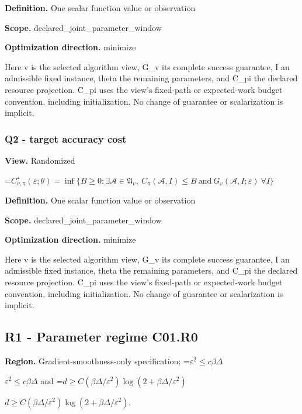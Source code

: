 \documentclass[10pt,a4paper]{article}
\newcommand{\AtlasMath}[1]{\par\begingroup\centering\setbox0=\hbox{$\displaystyle #1$}\ifdim\wd0>1.4\linewidth\typeout{ATLAS WIDE FORMULA: \the\wd0}\fi\ifdim\wd0>\linewidth\resizebox{\linewidth}{!}{\box0}\else\box0\fi\par\endgroup}
\newcommand{\AtlasInlineMath}[1]{\begingroup\setbox0=\hbox{$#1$}\ifdim\wd0>.4\linewidth\endgroup\AtlasMath{#1}\else\endgroup$#1$\fi}
\begin{document}
\textbf{Definition.} One scalar function value or observation



\textbf{Scope.} declared\_joint\_parameter\_window



\textbf{Optimization direction.} minimize



Here v is the selected algorithm view, G\_v its complete success guarantee, I an admissible fixed instance, theta the remaining parameters, and C\_pi the declared resource projection. C\_pi uses the view's fixed-path or expected-work budget convention, including initialization. No change of guarantee or scalarization is implicit.



\subsubsection{Q2 - target accuracy cost}


\textbf{View.} Randomized



\AtlasMath{C^\star_{v,\pi}(\varepsilon;\theta)=\inf\{B\ge0:\exists\mathcal A\in\mathfrak A_v,\ C_\pi(\mathcal A,I)\le B\ \text{and}\ G_v(\mathcal A,I;\varepsilon)\ \forall I\}}


\textbf{Definition.} One scalar function value or observation



\textbf{Scope.} declared\_joint\_parameter\_window



\textbf{Optimization direction.} minimize



Here v is the selected algorithm view, G\_v its complete success guarantee, I an admissible fixed instance, theta the remaining parameters, and C\_pi the declared resource projection. C\_pi uses the view's fixed-path or expected-work budget convention, including initialization. No change of guarantee or scalarization is implicit.



\subsection{R1 - Parameter regime C01.R0}


\textbf{Region.} Gradient-smoothness-only specification; \AtlasInlineMath{\varepsilon^2\le c\beta\Delta} and \AtlasInlineMath{d\ge C(\beta\Delta/\varepsilon^2)\log(2+\beta\Delta/\varepsilon^2)}.
\end{document}

